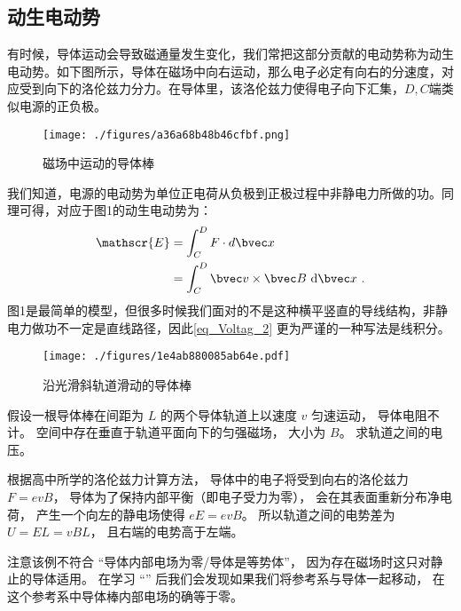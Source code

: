 \subsection{动生电动势}
有时候，导体运动会导致磁通量发生变化，我们常把这部分贡献的电动势称为动生电动势。如下图所示，导体在磁场中向右运动，那么电子必定有向右的分速度，对应受到向下的洛伦兹力分力。在导体里，该洛伦兹力使得电子向下汇集，$D,C$端类似电源的正负极。
\begin{figure}[ht]
\centering
\texttt{[image: ./figures/a36a68b48b46cfbf.png]}
\caption{磁场中运动的导体棒} \label{fig_Voltag_2}
\end{figure}
我们知道，电源的电动势为单位正电荷从负极到正极过程中非静电力所做的功。同理可得，对应于图1的动生电动势为：
\begin{equation}\label{eq_Voltag_2}
\begin{aligned}
\mathscr{E}&=\int_{C}^D F\cdot d\bvec x\\
&=\int_{C}^{D} \bvec  v\times \bvec B \mathrm{~d} \bvec x ~.
\end{aligned}
\end{equation}
图1是最简单的模型，但很多时候我们面对的不是这种横平竖直的导线结构，非静电力做功不一定是直线路径，因此\autoref{eq_Voltag_2} 更为严谨的一种写法是线积分。
\begin{example}{}
\begin{figure}[ht]
\centering
\texttt{[image: ./figures/1e4ab880085ab64e.pdf]}
\caption{沿光滑斜轨道滑动的导体棒} \label{fig_Voltag_1}
\end{figure}
假设一根导体棒在间距为 $L$ 的两个导体轨道上以速度 $v$ 匀速运动， 导体电阻不计。 空间中存在垂直于轨道平面向下的匀强磁场， 大小为 $B$。 求轨道之间的电压。

根据高中所学的洛伦兹力计算方法， 导体中的电子将受到向右的洛伦兹力 $F = evB$， 导体为了保持内部平衡（即电子受力为零）， 会在其表面重新分布净电荷， 产生一个向左的静电场使得 $eE = evB$。 所以轨道之间的电势差为 $U = EL = vBL$， 且右端的电势高于左端。
\end{example}

注意该例不符合 “导体内部电场为零/导体是等势体”， 因为存在磁场时这只对静止的导体适用。 在学习 “” 后我们会发现如果我们将参考系与导体一起移动， 在这个参考系中导体棒内部电场的确等于零。
